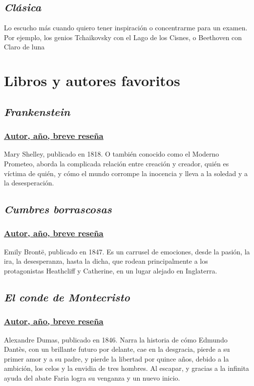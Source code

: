 \documentclass[letterpaper,12pt]{article}
\begin{document}
     \subsection{\textit{\Large{Clásica}}}
     \small{Lo escucho más cuando quiero tener inspiración o concentrarme para un examen.}
     \small{Por ejemplo, los genios Tchaikovsky con el Lago de los Cisnes, o Beethoven con Claro de luna}

\section{\Huge{Libros y autores favoritos}}

     \subsection{\textit{\Large{Frankenstein}}}
        \subsubsection{\underline{Autor, año, breve reseña}}
        \small{Mary Shelley, publicado en 1818. O también conocido como el Moderno Prometeo, aborda la complicada relación entre creación y creador, quién es víctima de quién, y cómo el mundo corrompe la inocencia y lleva a la soledad y a la desesperación.}
        
     \subsection{\textit{\Large{Cumbres borrascosas}}}
        \subsubsection{\underline{Autor, año, breve reseña}}
        \small{Emily Brontë, publicado en 1847. Es un carrusel de emociones, desde la pasión, la ira, la desesperanza, hasta la dicha, que rodean principalmente a los protagonistas Heathcliff y Catherine, en un lugar alejado en Inglaterra.}
        
     \subsection{\textit{\Large{El conde de Montecristo}}}
        \subsubsection{\underline{Autor, año, breve reseña}}
        \small{Alexandre Dumas, publicado en 1846. Narra la historia de cómo Edmundo Dantès, con un brillante futuro por delante, cae en la desgracia, pierde a su primer amor y a su padre, y pierde la libertad por quince años, debido a la ambición, los celos y la envidia de tres hombres. Al escapar, y gracias a la infinita ayuda del abate Faria logra su venganza y un nuevo inicio.}


\end{document}
